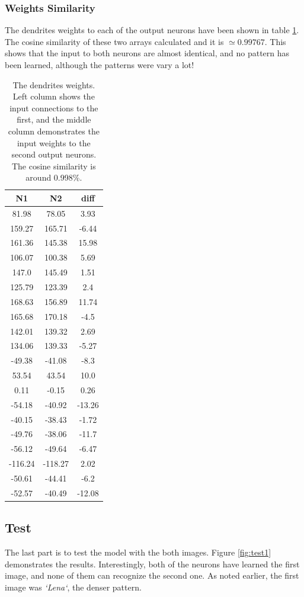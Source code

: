 \documentclass{article}
\begin{document}
	\subsubsection{Weights Similarity}
	The dendrites weights to each of the output neurons have been shown in table \ref{table:w}. The cosine similarity of these two arrays calculated and it is $\simeq 0.99767$. This shows that the input to both neurons are almost identical, and no pattern has been learned, although the patterns were vary a lot!
	\begin{table}
		\begin{tabular}{|c|c|c|}
			\hline
			N1 & N2 & diff \\
			\hline
			81.98 & 78.05 & 3.93\\
			159.27 & 165.71 & -6.44\\
			161.36 & 145.38 & 15.98\\
			106.07 & 100.38 & 5.69\\
			147.0 & 145.49 & 1.51\\
			125.79 & 123.39 & 2.4\\
			168.63 & 156.89 & 11.74\\
			165.68 & 170.18 & -4.5\\
			142.01 & 139.32 & 2.69\\
			134.06 & 139.33 & -5.27\\
			-49.38 & -41.08 & -8.3\\
			53.54 & 43.54 & 10.0\\
			0.11 & -0.15 & 0.26\\
			-54.18 & -40.92 & -13.26\\
			-40.15 & -38.43 & -1.72\\
			-49.76 & -38.06 & -11.7\\
			-56.12 & -49.64 & -6.47\\
			-116.24 & -118.27 & 2.02\\
			-50.61 & -44.41 & -6.2\\
			-52.57 & -40.49 & -12.08\\
			\hline
		\end{tabular}
		\caption{The dendrites weights. Left column shows the input connections to the first, and the middle column demonstrates the input weights to the second output neurons. The cosine similarity is around 0.998\%.}
		\label{table:w}
	\end{table}
	\subsection{Test}
	The last part is to test the model with the both images. Figure \ref{fig:test1} demonstrates the results. Interestingly, both of the neurons have learned the first image, and none of them can recognize the second one. As noted earlier, the first image was \textit{`Lena`}, the denser pattern.
	
\end{document}
